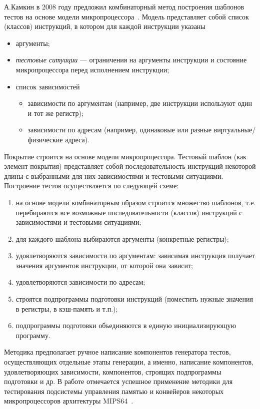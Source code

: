А.Камкин в 2008 году предложил комбинаторный метод построения шаблонов тестов на основе модели микропроцессора~\cite{MicroTESK}. Модель представляет собой список (классов) инструкций, в котором для каждой инструкции указаны
\begin{itemize}
\item аргументы;
\item \emph{тестовые ситуации} --- ограничения на аргументы инструкции и состояние микропроцессора перед исполнением инструкции;
\item список зависимостей
    \begin{itemize}
    \item зависимости по аргументам (например, две инструкции используют один и тот же регистр);
    \item зависимости по адресам (например, одинаковые или разные виртуальные/физические адреса).
    \end{itemize}
\end{itemize}

Покрытие строится на основе модели микропроцессора. Тестовый шаблон (как элемент покрытия) представляет собой последовательность инструкций некоторой длины с выбранными для них зависимостями и тестовыми ситуациями. Построение тестов осуществляется по следующей схеме:
\begin{enumerate}
\item на основе модели комбинаторным образом строится множество шаблонов, т.е. перебираются все возможные последовательности (классов) инструкций с зависимостями и тестовыми ситуациями;
\item для каждого шаблона выбираются аргументы (конкретные регистры);
\item удовлетворяются зависимости по аргументам: зависимая инструкция получает значения аргументов инструкции, от которой она зависит;
\item удовлетворяются зависимости по адресам;
\item строятся подпрограммы подготовки инструкций (поместить нужные значения в регистры, в кэш-память и т.п.);
\item подпрограммы подготовки объединяются в единую инициализирующую программу.
\end{enumerate}

Методика предполагает ручное написание компонентов генератора тестов, осуществляющих отдельные этапы генерации, а именно, написание компонентов, удовлетворяющих зависимости, компонентов, строящих подпрограммы подготовки и др. В работе отмечается успешное применение методики для тестирования подсистемы управления памятью и конвейеров некоторых микропроцессоров архитектуры MIPS64~\cite{mips64II}.

